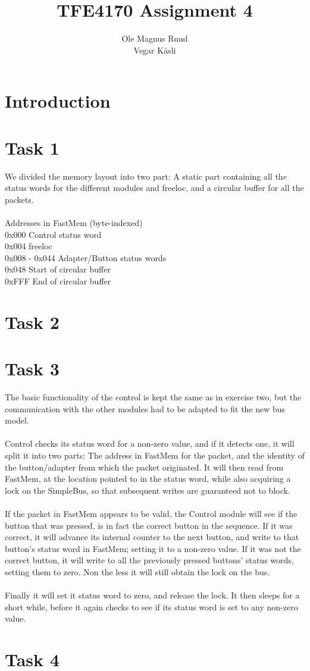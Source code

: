 \documentclass[11pt]{report}
\title{TFE4170 Assignment 4}
\author{Ole Magnus Ruud \\ Vegar K\aa sli}
\begin{document}
\maketitle
\clearpage

\section*{Introduction}


\section*{Task 1}
We divided the memory layout into two part: A static part containing all the
status words for the different modules and freeloc, and a circular buffer for
all the packets. 
\\
\\Addresses in FastMem (byte-indexed)
\\0x000 Control status word
\\0x004 freeloc
\\0x008 - 0x044 Adapter/Button status words
\\0x048 Start of circular buffer
\\0xFFF End of circular buffer

\section*{Task 2}

\section*{Task 3}
The basic functionality of the control is kept the same as in exercise two, but
the communication with the other modules had to be adapted to fit the new bus
model.\\
\\Control checks its status word for a non-zero value, and if it detects one, it
will split it into two parts: The address in FastMem for the packet, and the
identity of the button/adapter from which the packet originated. It will then
read from FastMem, at the location pointed to in the status word, while also
acquiring a lock on the SimpleBus, so that subsequent writes are guaranteed not
to block.\\
\\If the packet in FastMem appears to be valid, the Control module will see if
the button that was pressed, is in fact the correct button in the sequence. If
it was correct, it will advance its internal counter to the next button, and
write to that button's status word in FastMem; setting it to a non-zero value.
If it was not the correct button, it will write to all the previously pressed
buttons' status words, setting them to zero. Non the less it will still obtain
the lock on the bus.\\
\\Finally it will set it status word to zero, and release the lock. It then
sleeps for a short while, before it again checks to see if its status word is
set to any non-zero value.

\section*{Task 4}
\end{document}
